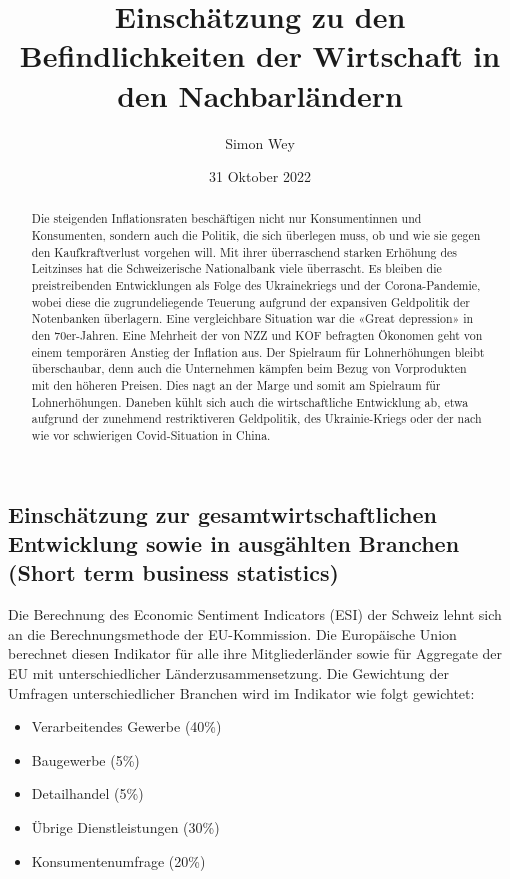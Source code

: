 \documentclass[
]{article}
\title{Einschätzung zu den Befindlichkeiten der Wirtschaft in den
Nachbarländern}
\author{Simon Wey}
\date{31 Oktober 2022}
\providecommand{\tightlist}{%
  \setlength{\itemsep}{0pt}\setlength{\parskip}{0pt}}
\begin{document}
\maketitle
\begin{abstract}
Die steigenden Inflationsraten beschäftigen nicht nur Konsumentinnen und
Konsumenten, sondern auch die Politik, die sich überlegen muss, ob und
wie sie gegen den Kaufkraftverlust vorgehen will. Mit ihrer überraschend
starken Erhöhung des Leitzinses hat die Schweizerische Nationalbank
viele überrascht. Es bleiben die preistreibenden Entwicklungen als Folge
des Ukrainekriegs und der Corona-Pandemie, wobei diese die
zugrundeliegende Teuerung aufgrund der expansiven Geldpolitik der
Notenbanken überlagern. Eine vergleichbare Situation war die «Great
depression» in den 70er-Jahren. Eine Mehrheit der von NZZ und KOF
befragten Ökonomen geht von einem temporären Anstieg der Inflation aus.
Der Spielraum für Lohnerhöhungen bleibt überschaubar, denn auch die
Unternehmen kämpfen beim Bezug von Vorprodukten mit den höheren Preisen.
Dies nagt an der Marge und somit am Spielraum für Lohnerhöhungen.
Daneben kühlt sich auch die wirtschaftliche Entwicklung ab, etwa
aufgrund der zunehmend restriktiveren Geldpolitik, des Ukrainie-Kriegs
oder der nach wie vor schwierigen Covid-Situation in China.
\end{abstract}

\renewcommand{\figurename}{Abbildung} 
\fontsize{13}{16}

\selectfont

\hypertarget{einschuxe4tzung-zur-gesamtwirtschaftlichen-entwicklung-sowie-in-ausguxe4hlten-branchen-short-term-business-statistics}{%
\subsection{Einschätzung zur gesamtwirtschaftlichen Entwicklung sowie in
ausgählten Branchen (Short term business
statistics)}\label{einschuxe4tzung-zur-gesamtwirtschaftlichen-entwicklung-sowie-in-ausguxe4hlten-branchen-short-term-business-statistics}}

Die Berechnung des Economic Sentiment Indicators (ESI) der Schweiz lehnt
sich an die Berechnungsmethode der EU-Kommission. Die Europäische Union
berechnet diesen Indikator für alle ihre Mitgliederländer sowie für
Aggregate der EU mit unterschiedlicher Länderzusammensetzung. Die
Gewichtung der Umfragen unterschiedlicher Branchen wird im Indikator wie
folgt gewichtet:

\begin{itemize}
\tightlist
\item
  Verarbeitendes Gewerbe (40\%)
\item
  Baugewerbe (5\%)
\item
  Detailhandel (5\%)
\item
  Übrige Dienstleistungen (30\%)
\item
  Konsumentenumfrage (20\%)
\end{itemize}
\end{document}
